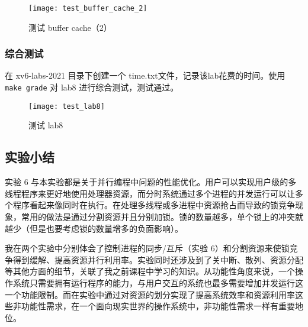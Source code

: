 \begin{figure}[!htb]
	\centering
	\texttt{[image: test\_buffer\_cache\_2]}
	\caption{测试 buffer cache（2）}
	\label{fig:test_buffer_cache_2}
\end{figure}


\subsubsection{综合测试}

在 xv6-labs-2021 目录下创建一个 time.txt文件，记录该lab花费的时间。使用 \texttt{make grade} 对 lab8 进行综合测试，测试通过。

\begin{figure}[!htb]
	\centering
	\texttt{[image: test\_lab8]}
	\caption{测试 lab8}
	\label{fig:test_lab8}
\end{figure}

\subsection{实验小结}

实验 6 与本实验都是关于并行编程中问题的性能优化。用户可以实现用户级的多线程程序来更好地使用处理器资源，而分时系统通过多个进程的并发运行可以让多个程序看起来像同时在执行。在处理多线程或多进程中资源抢占而导致的锁竞争现象，常用的做法是通过分割资源并且分别加锁。锁的数量越多，单个锁上的冲突就越少（但是也要考虑锁的数量增多的负面影响）。 

我在两个实验中分别体会了控制进程的同步/互斥（实验 6）和分割资源来使锁竞争得到缓解、提高资源并行利用率。实验同时还涉及到了关中断、散列、资源分配等其他方面的细节，关联了我之前课程中学习的知识。从功能性角度来说，一个操作系统只需要拥有运行程序的能力，与用户交互的系统也最多需要增加并发运行这一个功能限制。而在实验中通过对资源的划分实现了提高系统效率和资源利用率这些非功能性需求，在一个面向现实世界的操作系统中，非功能性需求一样有重要地位。 


